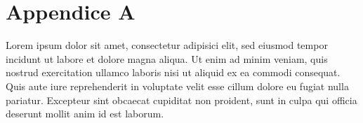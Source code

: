 \documentclass[../main.tex]{subfiles}
\begin{document}
\chapter{Appendice A}
\label{chap:appendix_a}

Lorem ipsum dolor sit amet, consectetur adipisici elit, sed eiusmod tempor incidunt ut labore et dolore magna aliqua. Ut enim ad minim veniam, quis nostrud exercitation ullamco laboris nisi ut aliquid ex ea commodi consequat. Quis aute iure reprehenderit in voluptate velit esse cillum dolore eu fugiat nulla pariatur. Excepteur sint obcaecat cupiditat non proident, sunt in culpa qui officia deserunt mollit anim id est laborum.
\end{document}

